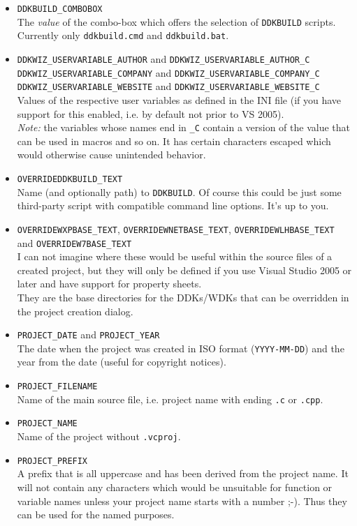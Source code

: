 \documentclass[a4paper,titlepage]{report}
\begin{document}
\begin{itemize}
  \item \verb+DDKBUILD_COMBOBOX+\\
        The \emph{value} of the combo-box which offers the selection of \texttt{DDKBUILD}
        scripts. Currently only \texttt{ddkbuild.cmd} and \texttt{ddkbuild.bat}.
  \item \verb+DDKWIZ_USERVARIABLE_AUTHOR+ and \verb+DDKWIZ_USERVARIABLE_AUTHOR_C+\\
        \verb+DDKWIZ_USERVARIABLE_COMPANY+ and \verb+DDKWIZ_USERVARIABLE_COMPANY_C+\\
        \verb+DDKWIZ_USERVARIABLE_WEBSITE+ and \verb+DDKWIZ_USERVARIABLE_WEBSITE_C+\\
        Values of the respective user variables as defined in the INI file (if
        you have support for this enabled, i.e. by default not prior to VS 2005).\\
        \emph{Note:} the variables whose names end in \verb+_C+ contain a version
        of the value that can be used in macros and so on. It has certain characters
        escaped which would otherwise cause unintended behavior.
  \item \verb+OVERRIDEDDKBUILD_TEXT+\\
        Name (and optionally path) to \texttt{DDKBUILD}. Of course this could be
        just some third-party script with compatible command line options. It's up
        to you.
  \item \verb+OVERRIDEWXPBASE_TEXT+, \verb+OVERRIDEWNETBASE_TEXT+, \verb+OVERRIDEWLHBASE_TEXT+ and \verb+OVERRIDEW7BASE_TEXT+\\
        I can not imagine where these would be useful within the source files of a
        created project, but they will only be defined if you use Visual Studio 2005
        or later and have support for property sheets.\\
        They are the base directories for the DDKs/WDKs that can be overridden in
        the project creation dialog.
  \item \verb+PROJECT_DATE+ and \verb+PROJECT_YEAR+\\
        The date when the project was created in ISO format (\texttt{YYYY-MM-DD})
        and the year from the date (useful for copyright notices).
  \item \verb+PROJECT_FILENAME+\\
        Name of the main source file, i.e. project name with ending \texttt{.c} or \texttt{.cpp}.
  \item \verb+PROJECT_NAME+\\
        Name of the project without \texttt{.vcproj}.
  \item \verb+PROJECT_PREFIX+\\
        A prefix that is all uppercase and has been derived from the project name.
        It will not contain any characters which would be unsuitable for function
        or variable names unless your project name starts with a number \textsf{;-)}.
        Thus they can be used for the named purposes.
\end{itemize}
\end{document}
